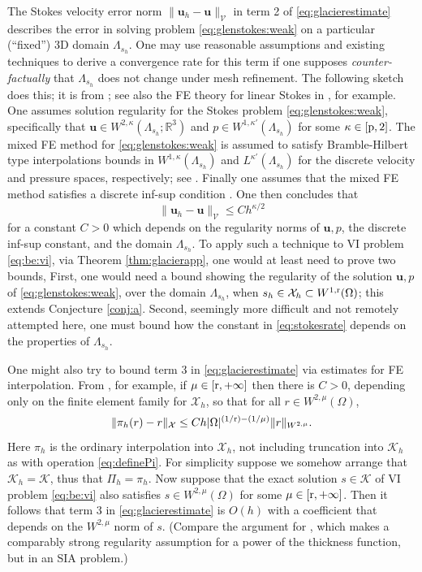 \documentclass[hidelinks,onefignum,onetabnum,final]{siamart220329}  %
\newcommand{\RR}{\mathbb{R}}
\newcommand{\bu}{\mathbf{u}}
\newcommand{\cK}{\mathcal{K}}
\newcommand{\cV}{\mathcal{V}}
\newcommand{\cX}{\mathcal{X}}
\newcommand{\pp}{{\text{\textnormal{p}}}}
\newcommand{\rr}{{\text{\textnormal{r}}}}
\begin{document}
The Stokes velocity error norm $\|\bu_h - \bu\|_{\cV}$ in term 2 of \eqref{eq:glacierestimate} describes the error in solving problem \eqref{eq:glenstokes:weak} on a particular (``fixed'') 3D domain $\Lambda_{s_h}$.  One may use reasonable assumptions and existing techniques to derive a convergence rate for this term if one supposes \emph{counter-factually} that $\Lambda_{s_h}$ does not change under mesh refinement.  The following sketch does this; it is from \cite[Theorem 4.9]{JouvetRappaz2011}; see also the FE theory for linear Stokes in \cite{Elmanetal2014}, for example.  One assumes solution regularity for the Stokes problem \eqref{eq:glenstokes:weak}, specifically that $\bu\in W^{2,\kappa}(\Lambda_{s_h};\RR^3)$ and $p \in W^{1,\kappa'}(\Lambda_{s_h})$ for some $\kappa \in [\pp,2]$.  The mixed FE method for \eqref{eq:glenstokes:weak} is assumed to satisfy Bramble-Hilbert type interpolations bounds in $W^{1,\kappa}(\Lambda_{s_h})$ and $L^{\kappa'}(\Lambda_{s_h})$ for the discrete velocity and pressure spaces, respectively; see \cite[inequalities (4.26), (4.27)]{JouvetRappaz2011}.  Finally one assumes that the mixed FE method satisfies a discrete inf-sup condition \cite[equation (4.1)]{JouvetRappaz2011}.  One then concludes that
\begin{equation}
\|\bu_h - \bu\|_{\cV} \le C h^{\kappa/2}
\label{eq:stokesrate}
\end{equation}
for a constant $C>0$ which depends on the regularity norms of $\bu,p$, the discrete inf-sup constant, and the domain $\Lambda_{s_h}$.  To apply such a technique to VI problem \eqref{eq:be:vi}, via Theorem \ref{thm:glacierapp}, one would at least need to prove two bounds,  First, one would need a bound showing the regularity of the solution $\bu,p$ of \eqref{eq:glenstokes:weak}, over the domain $\Lambda_{s_h}$, when $s_h \in \cX_h \subset W^{1,\rr}(\Omega)$; this extends Conjecture \ref{conj:a}.  Second, seemingly more difficult and not remotely attempted here, one must bound how the constant in \eqref{eq:stokesrate} depends on the properties of $\Lambda_{s_h}$.

One might also try to bound term 3 in \eqref{eq:glacierestimate} via estimates for FE interpolation.  From \cite[Theorem 3.1.6]{Ciarlet2002}, for example, if $\mu \in [\rr,+\infty]$ then there is $C>0$, depending only on the finite element family for $\cX_h$, so that for all $r \in W^{2,\mu}(\Omega)$,
\begin{equation}
\|\pi_h(r) - r\|_{\cX} \le C h |\Omega|^{(1/\rr)-(1/\mu)} \|r\|_{W^{2,\mu}}. \label{eq:ciarletregularity}
\end{equation}
Here $\pi_h$ is the ordinary interpolation into $\cX_h$, not including truncation into $\cK_h$ as with operation \eqref{eq:definePi}.  For simplicity suppose we somehow arrange that $\cK_h=\cK$, thus that $\Pi_h=\pi_h$.  Now suppose that the exact solution $s\in\cK$ of VI problem \eqref{eq:be:vi} also satisfies $s\in W^{2,\mu}(\Omega)$ for some $\mu \in [\rr,+\infty]$.  Then it follows that term 3 in \eqref{eq:glacierestimate} is $O(h)$ with a coefficient that depends on the $W^{2,\mu}$ norm of $s$.  (Compare the argument for \cite[Theorem 4.3]{JouvetBueler2012}, which makes a comparably strong regularity assumption for a power of the thickness function, but in an SIA problem.)
\end{document}
